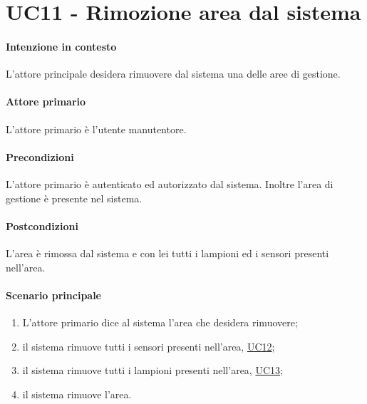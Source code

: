 \section{UC11 - Rimozione area dal sistema}\label{uc:11}

\paragraph{Intenzione in contesto} L'attore principale desidera rimuovere dal sistema una delle aree di gestione.

\paragraph{Attore primario} L'attore primario è l'utente manutentore.

\paragraph{Precondizioni} L'attore primario è autenticato ed autorizzato dal sistema. Inoltre l'area di gestione è presente nel sistema.

\paragraph{Postcondizioni} L'area è rimossa dal sistema e con lei tutti i lampioni ed i sensori presenti nell'area.

\paragraph{Scenario principale} 
\begin{enumerate}
    \item L'attore primario dice al sistema l'area che desidera rimuovere;
    \item il sistema rimuove tutti i sensori presenti nell'area, \hyperref[uc:12]{UC12};
    \item il sistema rimuove tutti i lampioni presenti nell'area, \hyperref[uc:13]{UC13};
    \item il sistema rimuove l'area.
\end{enumerate}